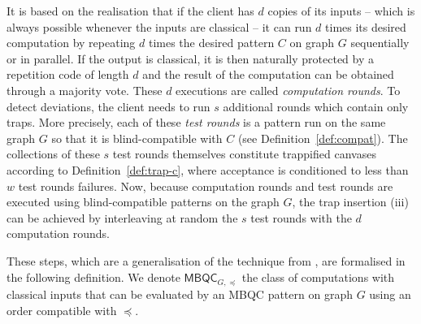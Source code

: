 \documentclass[12pt]{iopart}
\renewcommand{\1}{\mathds{1}}
\begin{document}
It is based on the realisation that if the client has $d$ copies of its inputs -- which is always possible whenever the inputs are classical -- it can run $d$ times its desired computation by repeating $d$ times the desired pattern $C$ on graph $G$ sequentially or in parallel.
If the output is classical, it is then naturally protected by a repetition code of length $d$ and the result of the computation can be obtained through a majority vote.
These $d$ executions are called \emph{computation rounds}.
To detect deviations, the client needs to run $s$ additional rounds which contain only traps.
More precisely, each of these \emph{test rounds} is a pattern run on the same graph $G$ so that it is blind-compatible with $C$ (see Definition~\ref{def:compat}).
The collections of these $s$ test rounds themselves constitute trappified canvases according to Definition~\ref{def:trap-c}, where acceptance is conditioned to less than $w$ test rounds failures.
Now, because computation rounds and test rounds are executed using blind-compatible patterns on the graph $G$, the trap insertion (iii) can be achieved by interleaving at random the $s$ test rounds with the $d$ computation rounds.

These steps, which are a generalisation of the technique from \cite{LMKO21:verifying}, are formalised in the following definition. We denote $\mathsf{MBQC}_{G, \preceq}$ the class of computations with classical inputs that can be evaluated by an MBQC pattern on graph $G$ using an order compatible with $\preceq$.
\end{document}
